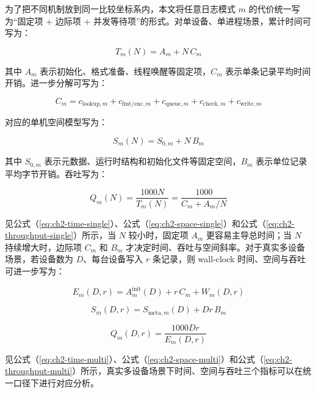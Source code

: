 为了把不同机制放到同一比较坐标系内，本文将任意日志模式 \(m\) 的代价统一写为``固定项 + 边际项 + 并发等待项''的形式。对单设备、单进程场景，累计时间可写为：

\begin{equation}
T_m(N)=A_m+N\,C_m
\label{eq:ch2-time-single}
\end{equation}

其中 \(A_m\) 表示初始化、格式准备、线程唤醒等固定项，\(C_m\) 表示单条记录平均时间开销。进一步分解可写为：

\[
C_m=c_{\text{lookup},m}+c_{\text{fmt/enc},m}+c_{\text{queue},m}+c_{\text{check},m}+c_{\text{write},m}
\]

对应的单机空间模型写为：

\begin{equation}
S_m(N)=S_{0,m}+N\,B_m
\label{eq:ch2-space-single}
\end{equation}

其中 \(S_{0,m}\) 表示元数据、运行时结构和初始化文件等固定空间，\(B_m\) 表示单位记录平均字节开销。吞吐写为：

\begin{equation}
Q_m(N)=\frac{1000N}{T_m(N)}=\frac{1000}{C_m+A_m/N}
\label{eq:ch2-throughput-single}
\end{equation}

见公式（\ref{eq:ch2-time-single}）、公式（\ref{eq:ch2-space-single}）和公式（\ref{eq:ch2-throughput-single}）所示，当 \(N\) 较小时，固定项 \(A_m\) 更容易主导总时间；当 \(N\) 持续增大时，边际项 \(C_m\) 和 \(B_m\) 才决定时间、吞吐与空间斜率。对于真实多设备场景，若设备数为 \(D\)、每台设备写入 \(r\) 条记录，则 wall-clock 时间、空间与吞吐可进一步写为：

\begin{equation}
E_m(D,r)=A^{\text{init}}_m(D)+r\,C_m+W_m(D,r)
\label{eq:ch2-time-multi}
\end{equation}

\begin{equation}
S_m(D,r)=S_{\text{meta},m}(D)+Dr\,B_m
\label{eq:ch2-space-multi}
\end{equation}

\begin{equation}
Q_m(D,r)=\frac{1000Dr}{E_m(D,r)}
\label{eq:ch2-throughput-multi}
\end{equation}

见公式（\ref{eq:ch2-time-multi}）、公式（\ref{eq:ch2-space-multi}）和公式（\ref{eq:ch2-throughput-multi}）所示，真实多设备场景下时间、空间与吞吐三个指标可以在统一口径下进行对应分析。

